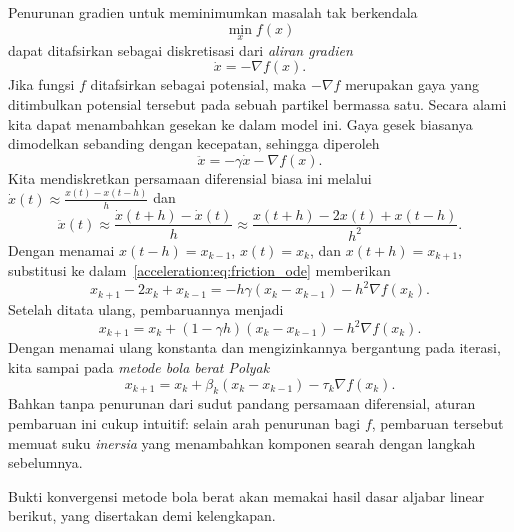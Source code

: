 Penurunan gradien untuk meminimumkan masalah tak berkendala
\begin{equation}
    \min_x f(x)
\end{equation}
dapat ditafsirkan sebagai diskretisasi dari \emph{aliran gradien}
\begin{equation}
    \dot x=-\nabla f(x).
\end{equation}
Jika fungsi \(f\) ditafsirkan sebagai potensial, maka \(-\nabla f\) merupakan gaya yang ditimbulkan potensial tersebut pada sebuah partikel bermassa satu. Secara alami kita dapat menambahkan gesekan ke dalam model ini. Gaya gesek biasanya dimodelkan sebanding dengan kecepatan, sehingga diperoleh
\begin{equation}\label{acceleration:eq:friction_ode}
    \ddot x=-\gamma\dot x-\nabla f(x).
\end{equation}
Kita mendiskretkan persamaan diferensial biasa ini melalui \(\dot x(t)\approx\frac{x(t)-x(t-h)}{h}\) dan
\begin{equation}
    \ddot x(t)
    \approx\frac{\dot x(t+h)-\dot x(t)}{h}
    \approx\frac{x(t+h)-2x(t)+x(t-h)}{h^2}.
\end{equation}
Dengan menamai \(x(t-h)=x_{k-1}\), \(x(t)=x_k\), dan \(x(t+h)=x_{k+1}\), substitusi ke dalam~\cref{acceleration:eq:friction_ode} memberikan
\begin{equation}
    x_{k+1}-2x_k+x_{k-1}
    =-h\gamma(x_k-x_{k-1})-h^2\nabla f(x_k).
\end{equation}
Setelah ditata ulang, pembaruannya menjadi
\begin{equation}
    x_{k+1}=x_k+(1-\gamma h)(x_k-x_{k-1})-h^2\nabla f(x_k).
\end{equation}
Dengan menamai ulang konstanta dan mengizinkannya bergantung pada iterasi, kita sampai pada \emph{metode bola berat Polyak}
\begin{equation}
    x_{k+1}=x_k+\beta_k(x_k-x_{k-1})-\tau_k\nabla f(x_k).
\end{equation}
Bahkan tanpa penurunan dari sudut pandang persamaan diferensial, aturan pembaruan ini cukup intuitif: selain arah penurunan bagi \(f\), pembaruan tersebut memuat suku \emph{inersia} yang menambahkan komponen searah dengan langkah sebelumnya.

Bukti konvergensi metode bola berat akan memakai hasil dasar aljabar linear berikut, yang disertakan demi kelengkapan.

